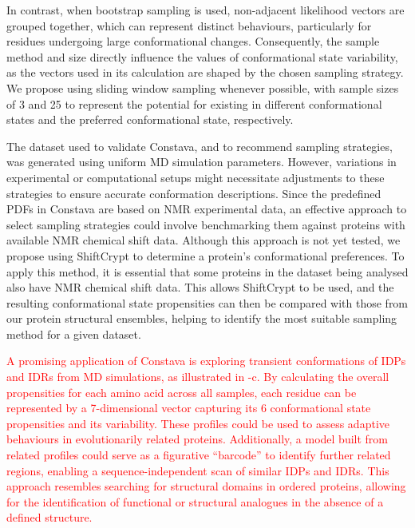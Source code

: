 In contrast, when bootstrap sampling is used, non-adjacent likelihood vectors are grouped together, which can represent distinct behaviours, particularly for residues undergoing large conformational changes. Consequently, the sample method and size directly influence the values of conformational state variability, as the vectors used in its calculation are shaped by the chosen sampling strategy. We propose using sliding window sampling whenever possible, with sample sizes of 3 and 25 to represent the potential for existing in different conformational states and the preferred conformational state, respectively.

The dataset used to validate Constava, and to recommend sampling strategies, was generated using uniform MD simulation parameters. However, variations in experimental or computational setups might necessitate adjustments to these strategies to ensure accurate conformation descriptions. Since the predefined PDFs in Constava are based on NMR experimental data, an effective approach to select sampling strategies could involve benchmarking them against proteins with available NMR chemical shift data. Although this approach is not yet tested, we propose using ShiftCrypt \cite{orlando_shiftcrypt_2020} to determine a protein's conformational preferences. To apply this method, it is essential that some proteins in the dataset being analysed also have NMR chemical shift data. This allows ShiftCrypt to be used, and the resulting conformational state propensities can then be compared with those from our protein structural ensembles, helping to identify the most suitable sampling method for a given dataset.


\textcolor{red}{A promising application of Constava is exploring transient conformations of IDPs and IDRs from MD simulations, as illustrated in -c. By calculating the overall propensities for each amino acid across all samples, each residue can be represented by a 7-dimensional vector capturing its 6 conformational state propensities and its variability. These profiles could be used to assess adaptive behaviours in evolutionarily related proteins. Additionally, a model built from related profiles could serve as a figurative ``barcode'' to identify further related regions, enabling a sequence-independent scan of similar IDPs and IDRs. This approach resembles searching for structural domains in ordered proteins, allowing for the identification of functional or structural analogues in the absence of a defined structure.}


